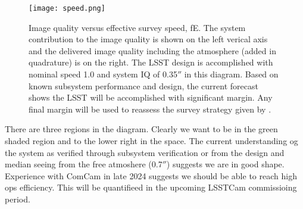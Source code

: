 \begin{figure}%
\texttt{[image: speed.png]}
\caption{Image quality versus effective survey speed, fE. The system contribution to the image quality is shown on the left verical axis and the delivered image quality including the atmosphere (added in quadrature) is on the right. The LSST design is accomplished with nominal speed 1.0 and system IQ of 0.35$''$ in this diagram. Based on known subsystem performance and design, the current forecast shows the LSST will be accomplished with significant margin. Any final margin will be used to reassess the survey strategy given by \cite{PSTN-056}.}
\label{speed}
\end{figure}

There are three regions in the diagram. Clearly we want to be in the green shaded region and to the lower right in the space. The current understanding og the system as verified through subsystem verification or from the design and median seeing from the free atmoshere (0.7$''$) suggests we are in good shape. Experience with ComCam in late 2024 suggests we should be able to reach high ops efficiency. This will be quantifieed in the upcoming LSSTCam commissioing period.  


